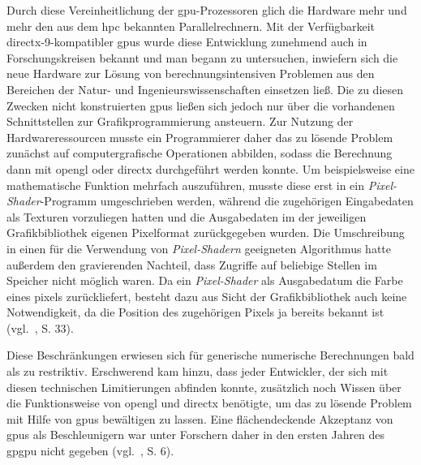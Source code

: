 Durch diese Vereinheitlichung der \gls{gpu}-Prozessoren glich die Hardware mehr und mehr den aus dem \gls{hpc} bekannten
Parallelrechnern. Mit der Verfügbarkeit \gls{directx}-9-kompatibler \gls{gpu}s wurde diese Entwicklung zunehmend
auch in Forschungskreisen bekannt und man begann zu untersuchen, inwiefern sich die neue Hardware zur Lösung von
berechnungsintensiven Problemen aus den Bereichen der Natur- und Ingenieurswissenschaften einsetzen ließ. Die zu diesen
Zwecken nicht konstruierten \gls{gpu}s ließen sich jedoch nur über die vorhandenen Schnittstellen zur
Grafikprogrammierung ansteuern. Zur Nutzung der Hardwareressourcen musste ein Programmierer daher das zu lösende Problem
zunächst auf computergrafische Operationen abbilden, sodass die Berechnung dann mit \gls{opengl} oder \gls{directx}
durchgeführt werden konnte. Um beispielsweise eine mathematische Funktion mehrfach auszuführen, musste diese erst in
ein \textit{Pixel-Shader}-Programm umgeschrieben werden, während die zugehörigen Eingabedaten als Texturen
vorzuliegen hatten und die Ausgabedaten im der jeweiligen Grafikbibliothek eigenen Pixelformat zurückgegeben wurden.
Die Umschreibung in einen für die Verwendung von \textit{Pixel-Shadern} geeigneten Algorithmus hatte außerdem den
gravierenden Nachteil, dass Zugriffe auf beliebige Stellen im Speicher nicht möglich waren. Da ein \textit{Pixel-Shader}
als Ausgabedatum die Farbe eines \gls{pixel}s zurückliefert, besteht dazu aus Sicht der Grafikbibliothek auch keine
Notwendigkeit, da die Position des zugehörigen Pixels ja bereits bekannt ist (vgl.~\cite{kirkhwu}, S. 33).

Diese Beschränkungen erwiesen sich für generische numerische Berechnungen bald als zu restriktiv. Erschwerend kam hinzu, 
dass jeder Entwickler, der sich mit diesen technischen Limitierungen abfinden konnte, zusätzlich noch Wissen über die
Funktionsweise von \gls{opengl} und \gls{directx} benötigte, um das zu lösende Problem mit Hilfe von \gls{gpu}s
bewältigen zu lassen. Eine flächendeckende Akzeptanz von \gls{gpu}s als Beschleunigern war unter Forschern daher in den
ersten Jahren des \gls{gpgpu} nicht gegeben (vgl.~\cite{sandkand}, S. 6).

